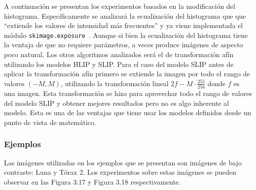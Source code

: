 A continuaci\'on se presentan los experimentos basados en la modificaci\'on del histograma. Espec\'ificamente se analizar\'a la ecualizaci\'on del histograma que  que ``extiende los valores de intensidad más frecuentes'' y ya viene implementada el m\'odulo \verb|skimage.exposure|~\cite{histogram_equalization}. Aunque si bien la ecualización del histograma tiene la ventaja de que no requiere parámetros, a veces produce imágenes de aspecto poco natural. Los otros algoritmos analizados ser\'a el de transformaci\'on af\'in utilizando los modelos HLIP y SLIP. Para el caso del modelo SLIP antes de aplicar la transformaci\'on af\'in primero se extiende la imagen por todo el rango de valores $(-M,M)$, utilizando la transformaci\'on lineal $2f-M\cdot\frac{255}{256}$ donde $f$ es una imagen. Esta transformaci\'on se hizo para aprovechar todo el rango de valores del modelo SLIP y obtener mejores resultados pero no es algo inherente al modelo. Esta es una de las ventajas que tiene usar los modelos definidos desde un punto de vista de matem\'atico. 

\subsubsection{Ejemplos}

Las im\'agenes utilizadas en los ejemplos que se presentan son im\'agenes de bajo contraste: Luna y T\'orax 2. Los experimentos sobre estas im\'agenes se pueden observar en las Figura 3.17 y Figura 3.18 respectivamente.

